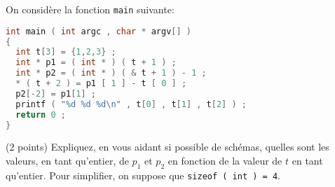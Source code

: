 
\begin{center}
\end{center}

On considère la fonction \texttt{main} suivante:

\begin{lstlisting}[language=C]
int main ( int argc , char * argv[] )
{
  int t[3] = {1,2,3} ;
  int * p1 = ( int * ) ( t + 1 ) ;
  int * p2 = ( int * ) ( & t + 1 ) - 1 ;
  * ( t + 2 ) = p1 [ 1 ] - t [ 0 ] ;
  p2[-2] = p1[1] ;
  printf ( "%d %d %d\n" , t[0] , t[1] , t[2] ) ;
  return 0 ;
}
\end{lstlisting}

\question (2 points) Expliquez, en vous aidant si possible de schémas,
quelles sont les valeurs, en tant qu'entier, de \(p_1\) et \(p_2\) en
fonction de la valeur de \(t\) en tant qu'entier. Pour simplifier, on
suppose que \texttt{sizeof ( int ) = 4}.

